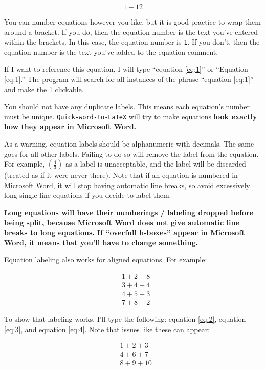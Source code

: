 \documentclass[12pt]{article}
\theoremstyle{plain}
\theoremstyle{remark}
\theoremstyle{definition}
\begin{document}
\begin{equation}
1 + 12\tag{1} \label{eq:1}
\end{equation}


You can number equations however you like, but it is good practice to
wrap them around a bracket. If you do, then the equation number is the
text you've entered within the brackets. In this case, the equation
number is \texttt{1}. If you don't, then the equation number is the text
you've added to the equation comment.

If I want to reference this equation, I will type ``equation \ref{eq:1}'' or
``Equation \ref{eq:1}.'' The program will search for all instances of the phrase
``equation \ref{eq:1}'' and make the 1 clickable.

You should not have any duplicate labels. This means each equation's
number must be unique. \texttt{Quick-word-to-LaTeX} will try to make
equations \textbf{look exactly how they appear in Microsoft Word.}

As a warning, equation labels should be alphanumeric with decimals. The
same goes for all other labels. Failing to do so will remove the label
from the equation. For example, \(\left( \frac{4}{3} \right)\) as a
label is unacceptable, and the label will be discarded (treated as if it
were never there). Note that if an equation is numbered in Microsoft
Word, it will stop having automatic line breaks, so avoid excessively
long single-line equations if you decide to label them.

\textbf{Long equations will have their numberings / labeling dropped
before being split, because Microsoft Word does not give automatic line
breaks to long equations. If ``overfull h-boxes'' appear in Microsoft
Word, it means that you'll have to change something.}

Equation labeling also works for aligned equations. For example:

\begin{align*}
&1 + 2 + 8\tag{2} \label{eq:2} \\
&3 + 4 + 4\tag{3} \label{eq:3} \\
&4 + 5 + 3 \\
&7 + 8 + 2\tag{4} \label{eq:4}
\end{align*}


To show that labeling works, I'll type the following: equation \ref{eq:2},
equation \ref{eq:3}, and equation \ref{eq:4}. Note that issues like these can appear:

\begin{align*}
&1 + 2 + 3\tag{5} \label{eq:5} \\
&4 + 6 + 7 \\
&8 + 9 + 10\tag{6} \label{eq:6}
\end{align*}
\end{document}
